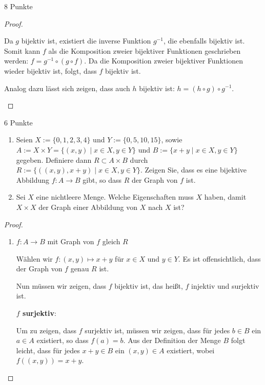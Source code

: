 \documentclass{problemset}
\begin{document}
\begin{problem}{8 Punkte}
\begin{proof}
\begin{enumerate}
              Da $g$ bijektiv ist, existiert die inverse Funktion $g^{-1}$, die
              ebenfalls bijektiv ist. Somit kann $f$ als die Komposition zweier
              bijektiver Funktionen geschrieben werden: $f = g^{-1} \circ (g
              \circ f)$. Da die Komposition zweier bijektiver Funktionen wieder
              bijektiv ist, folgt, dass $f$ bijektiv ist.

              Analog dazu lässt sich zeigen, dass auch $h$ bijektiv ist: $h =
              (h \circ g) \circ g^{-1}$.

    \end{enumerate}
\end{proof}
\end{problem}

\pagebreak

\begin{problem}[Graphen]{6 Punkte}
\begin{enumerate}
    \item Seien $X := \{0, 1, 2, 3, 4\}$ und $Y := \{0, 5, 10, 15\}$, sowie $A
          := X \times Y = \{(x, y) \mid x \in X, y \in Y\}$ und $B := \{x + y
          \mid x \in X, y \in Y\}$ gegeben. Definiere dann $R \subset A \times
          B$ durch $R := \{((x, y), x + y) \mid x \in X, y \in Y\}$. Zeigen
          Sie, dass es eine bijektive Abbildung $f : A \to B$ gibt, so dass $R$
          der Graph von $f$ ist.

    \item Sei $X$ eine nichtleere Menge. Welche Eigenschaften muss $X$ haben,
          damit $X \times X$ der Graph einer Abbildung von $X$ nach $X$ ist?

\end{enumerate}

\begin{proof} $ $
    \begin{enumerate}
        \item $f: A \rightarrow B$ mit Graph von $f$ gleich $R$

              Wählen wir \(f: (x, y) \mapsto x + y\) für \(x \in X\) und \(y
              \in Y\). Es ist offensichtlich, dass der Graph von \(f\) genau
              \(R\) ist.

              Nun müssen wir zeigen, dass \(f\) bijektiv ist, das heißt, \(f\)
              injektiv und surjektiv ist.

              \textbf{\(f\) surjektiv}:

              Um zu zeigen, dass \(f\) surjektiv ist, müssen wir zeigen, dass
              für jedes \(b \in B\) ein \(a \in A\) existiert, so dass \(f(a) =
              b\). Aus der Definition der Menge \(B\) folgt leicht, dass für
              jedes \(x + y \in B\) ein \((x, y) \in A\) existiert, wobei
              \(f((x, y)) = x + y\).


\end{enumerate}
\end{proof}
\end{problem}
\end{document}
